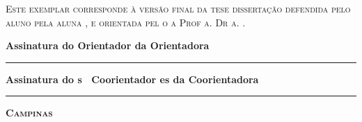 \noindent
\begin{minipage}[c]{.5\textwidth}
  {\footnotesize\textsc{Este exemplar corresponde à versão final da
  \ifx\mestrado\undefined
  tese
  \else
  dissertação
  \fi
  defendida
  \ifx\femaleAuthor\undefined
  pelo aluno
  \else
  pela aluna
  \fi
  \autor,
  e orientada pel\ifx\femaleOrientador\undefined
  o\else
  a\fi{} Prof\ifx\femaleOrientador\undefined
  \else
  a\fi. Dr\ifx\femaleOrientador\undefined
  \else
  a\fi. \orientador.
  }}
\end{minipage}
\vspace{1cm}

\noindent
{\small\textbf{Assinatura
\ifx\femaleOrientador\undefined
do Orientador
\else
da Orientadora
\fi
}

\vspace{.5cm}
\noindent
\rule[1pt]{7cm}{.5pt}  %
}
\vspace{.5cm}

\ifx\coorientador\undefined
\else
\noindent
{\small\textbf{Assinatura
\ifx\femaleCoorientador\undefined
do\ifx\Coorientadores\undefined
\else s \fi\
Coorientador\ifx\Coorientadores\undefined
\else es \fi 
\else
da Coorientadora
\fi
}

\vspace{.5cm}
\noindent
\rule[1pt]{7cm}{.5pt}  %
}
\fi
\vfill
\begin{center}
  {\small\textbf{\textsc{ Campinas \\ \ano}}}
\end{center}
